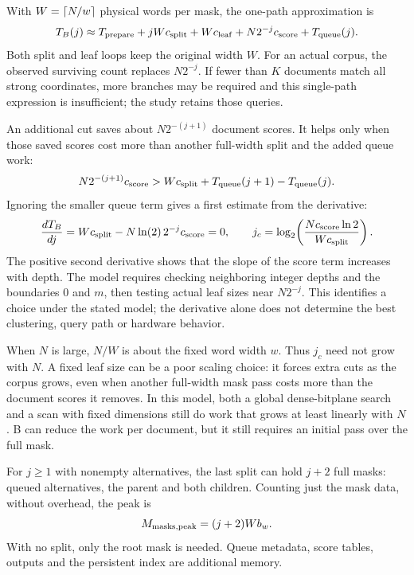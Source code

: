 With $W=\left\lceil N/w\right\rceil$ physical words per mask, the one-path approximation is
\begin{equation}
T_B(j)\approx T_{\rm prepare}+jWc_{\rm split}+Wc_{\rm leaf}
                    +N2^{-j}c_{\rm score}+T_{\rm queue}(j).
\label{eq:one-path-time}
\end{equation}
Both split and leaf loops keep the original width $W$. For an actual corpus, the observed
surviving count replaces $N2^{-j}$. If fewer than $K$ documents match all strong coordinates, more branches may
be required and this single-path expression is insufficient; the study retains those queries.

An additional cut saves about $N2^{-(j+1)}$ document scores. It helps only when those saved scores
cost more than another full-width split and the added queue work:
\begin{equation}
N2^{-(j+1)}c_{\rm score}>
 Wc_{\rm split}+T_{\rm queue}(j+1)-T_{\rm queue}(j).
\label{eq:one-more-cut}
\end{equation}
Ignoring the smaller queue term gives a first estimate from the derivative:
\[
\frac{dT_B}{dj}=Wc_{\rm split}-N\ln(2)\,2^{-j}c_{\rm score}=0,
\qquad
j_c=\log_2\!\left(\frac{Nc_{\rm score}\ln 2}{Wc_{\rm split}}\right).
\]
The positive second derivative shows that the slope of the score term increases
with depth. The model requires checking neighboring integer depths and the boundaries $0$ and $m$,
then testing actual leaf sizes near $N2^{-j}$. This identifies a choice under the stated model;
the derivative alone does not determine the best clustering, query path or hardware behavior.

When $N$ is large, $N/W$ is about the fixed word width $w$. Thus $j_c$ need not grow with $N$.
A fixed leaf size can be a poor scaling choice: it forces extra cuts as the corpus grows,
even when another full-width mask pass costs more than the document scores it removes.
In this model, both a global dense-bitplane search and a scan with fixed dimensions still
do work that grows at least linearly with $N$. B can reduce the work per document, but it
still requires an initial pass over the full mask.

For $j\ge1$ with nonempty alternatives, the last split can hold $j+2$ full masks: queued
alternatives, the parent and both children. Counting just the mask data, without overhead, the peak is
\[
M_{\rm masks,peak}=(j+2)Wb_w.
\]
With no split, only the root mask is needed. Queue metadata, score tables, outputs and the
persistent index are additional memory.

